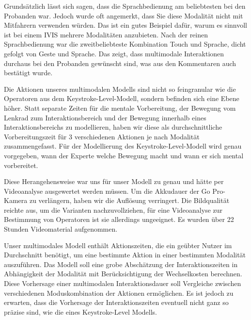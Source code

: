 Grundsätzlich lässt sich sagen, dass die Sprachbedienung am beliebtesten bei den Probanden war. 
Jedoch wurde oft angemerkt, dass Sie diese Modalität nicht mit Mitfahrern verwenden würden. 
Das ist ein gutes Beispiel dafür, warum es sinnvoll ist bei einem IVIS mehrere Modalitäten anzubieten. 
Nach der reinen Sprachbedienung war die zweitbeliebteste Kombination Touch und Sprache, dicht gefolgt von Geste und Sprache. 
Das zeigt, dass multimodale Interaktionen durchaus bei den Probanden gewünscht sind, was aus den Kommentaren auch bestätigt wurde.

Die Aktionen unseres multimodalen Modells sind nicht so feingranular wie die Operatoren aus dem Keystroke-Level-Modell, sondern befinden sich eine Ebene höher. 
Statt separate Zeiten für die mentale Vorbereitung, der Bewegung vom Lenkrad zum Interaktionsbereich und der Bewegung innerhalb eines Interaktionsbereichs zu modellieren, haben wir diese als durchschnittliche Vorbereitungszeit für 3 verschiedenen Aktionen je nach Modalität zusammengefasst. 
Für der Modellierung des Keystroke-Level-Modell wird genau vorgegeben, wann der Experte welche Bewegung macht und wann er sich mental vorbereitet. 

Diese Herangehensweise war uns für unser Modell zu genau und hätte per Videoanalyse ausgewertet werden müssen. 
Um die Akkudauer der Go Pro-Kamera zu verlängern, haben wir die Auflösung verringert. 
Die Bildqualität reichte aus, um die Varianten nachzuvollziehen, für eine Videoanalyse zur Bestimmung von Operatoren ist sie allerdings ungeeignet. 
Es wurden über 22 Stunden Videomaterial aufgenommen.

Unser multimodales Modell enthält Aktionszeiten, die ein geübter Nutzer im Durchschnitt benötigt, um eine bestimmte Aktion in einer bestimmten Modalität auszuführen. 
Das Modell soll eine grobe Abschätzung der Interaktionszeiten in Abhängigkeit der Modalität mit Berücksichtigung der Wechselkosten berechnen. 
Diese Vorhersage einer multimodalen Interaktionsdauer soll Vergleiche zwischen verschiedenen Moduskombination der Aktionen ermöglichen. 
Es ist jedoch zu erwarten, dass die Vorhersage der Interaktionszeiten eventuell nicht ganz so präzise sind, wie die eines Keystroke-Level Modells.
